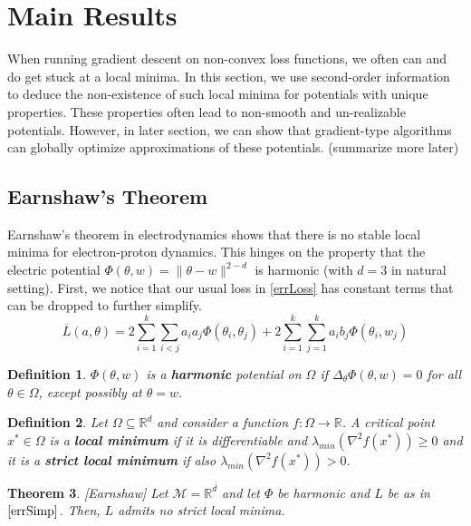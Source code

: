 \documentclass{article}
\newtheorem{theorem}{Theorem}[section]
\newtheorem{definition}[theorem]{Definition}
\newcommand{\R}{{\mathbb{R}}}
\begin{document}
\section{Main Results} 

When running gradient descent on non-convex loss functions, we often can and do get stuck at a local minima. In this section, we use second-order information to deduce the non-existence of such local minima for potentials with unique properties. These properties often lead to non-smooth and un-realizable potentials. However, in later section, we can show that gradient-type algorithms can globally optimize approximations of these potentials.   (summarize more later)

\subsection{Earnshaw's Theorem}

Earnshaw's theorem in electrodynamics shows that there is no stable local minima for electron-proton dynamics. This hinges on the property that the electric potential $\Phi(\theta,w) = \|\theta-w\|^{2-d}$ is harmonic (with $d = 3$ in natural setting). First, we notice that our usual loss in \eqref{errLoss} has constant terms that can be dropped to further simplify.
%
\begin{equation}\label{errSimp}
\overline{L}(a,\theta) =  2\sum_{i=1}^k\sum_{i < j} a_ia_j\Phi(\theta_i,\theta_j) + 2\sum_{i=1}^k\sum_{j=1}^ka_ib_j \Phi(\theta_i,w_j)
\end{equation} 
%
\begin{definition}
$\Phi(\theta,w)$ is a {\bf harmonic} potential on $\Omega$ if $\Delta_\theta \Phi(\theta,w) = 0$ for all $\theta \in \Omega$, except possibly at $\theta = w$.
\end{definition}

\begin{definition}
Let $\Omega \subseteq \R^d$ and consider a function $f:\Omega \to \R$. A critical point $x^* \in \Omega$ is a {\bf local minimum} if it is differentiable and $\lambda_{min}(\nabla^2 f(x^*)) \geq 0$ and it is a {\bf strict local minimum}  if also $\lambda_{min}(\nabla^2 f(x^*)) > 0$.
\end{definition}

\begin{theorem}\label{Earnshaw} \cite{arnold1985mathematical}[Earnshaw]
Let $\mathcal{M} = \R^d$ and let $\Phi$ be harmonic and $L$ be as in $\eqref{errSimp}$. Then, $L$ admits no strict local minima. 
\end{theorem}
\end{document}
